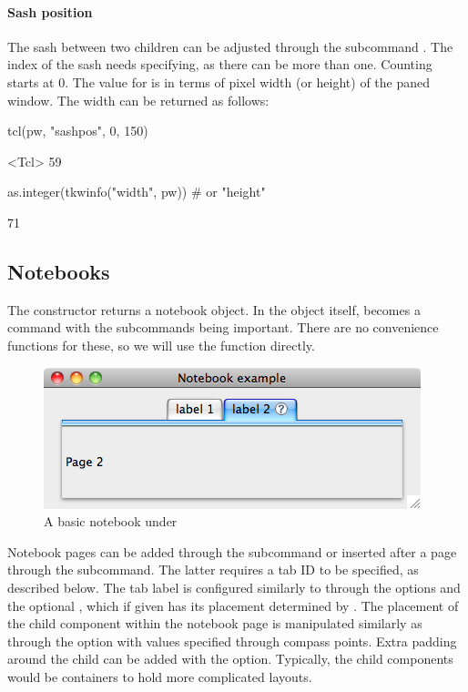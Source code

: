 \paragraph{Sash position}
The sash between two children can be adjusted through the subcommand
. The index of the sash needs
specifying, as there can be more than one. Counting starts at 0. The
value for  is in terms of pixel width (or height) of the
paned window. The width can be returned as follows:
\begin{Schunk}
\begin{Sinput}
 tcl(pw, "sashpos", 0, 150)
\end{Sinput}
\begin{Soutput}
<Tcl> 59 
\end{Soutput}
\begin{Sinput}
 as.integer(tkwinfo("width", pw))  # or "height"
\end{Sinput}
\begin{Soutput}
[1] 71
\end{Soutput}
\end{Schunk}
%

\subsection{Notebooks}
\label{sec:tcltk:notebooks}

The  constructor returns a notebook
object. In \TK\/ the object itself, becomes a command with the
subcommands being important. There are no convenience functions for
these, so we will use the  function directly.
%
\begin{figure}
  \centering
  \includegraphics[width=.6\textwidth]{fig-tcltk-notebook}
 \caption{A basic notebook under \OSX{}}
  \label{fig:fig-notebook-example}
\end{figure}


Notebook pages can be added through the 
subcommand or inserted after a page through the
 subcommand. The latter requires a tab
ID to be specified, as described below. The tab label is configured
similarly to  through the options
 and the optional
, which if given has its placement
determined by .  The placement of the
child component within the notebook page is manipulated similarly as
 through the  option with
values specified through compass points. Extra padding around the
child can be added with the 
option. Typically, the child components would be containers to hold
more complicated layouts.

